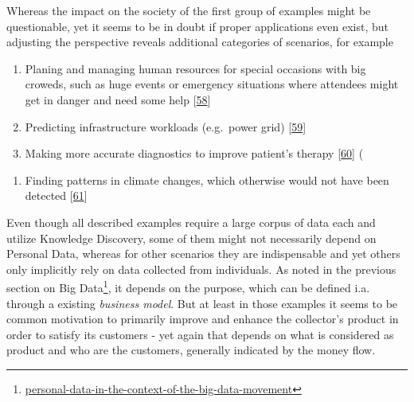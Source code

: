 \documentclass[12pt,english,a4paper,titlepage,cleardoublepage=empty,dottedtoc]{report}
\renewcommand{\href}[2]{#2\footnote{\url{#1}}}
\providecommand{\tightlist}{%
  \setlength{\itemsep}{0pt}\setlength{\parskip}{0pt}}
\begin{document}
Whereas the impact on the society of the first group of examples might
be questionable, yet it seems to be in doubt if proper applications even
exist, but adjusting the perspective reveals additional categories of
scenarios, for example

\begin{enumerate}
\def\labelenumi{(\Alph{enumi})}
\setcounter{enumi}{3}
\item
  Planing and managing human resources for special occasions with big
  croweds, such as huge events or emergency situations where attendees
  might get in danger and need some help
  {[}\protect\hyperlink{ref-estimating-the-locations-of-emergency-events-from-twitter-streams_2014}{58}{]}
\item
  Predicting infrastructure workloads (e.g.~power grid)
  {[}\protect\hyperlink{ref-paper_2015_improving-power-grid-monitoring-data-quality-an-efficient-machine-learning-framework-for-missing-data-prediction}{59}{]}
\item
  Making more accurate diagnostics to improve patient's therapy
  {[}\protect\hyperlink{ref-the-practice-of-predictive-analytics-in-healthcare_2013}{60}{]}
  (
\end{enumerate}

\begin{enumerate}
\def\labelenumi{\Alph{enumi})}
\setcounter{enumi}{6}
\tightlist
\item
  Finding patterns in climate changes, which otherwise would not have
  been detected
  {[}\protect\hyperlink{ref-data-collection-for-climate-changes_2014}{61}{]}
\end{enumerate}

Even though all described examples require a large corpus of data each
and utilize Knowledge Discovery, some of them might not necessarily
depend on Personal Data, whereas for other scenarios they are
indispensable and yet others only implicitly rely on data collected from
individuals. As noted in the
\href{personal-data-in-the-context-of-the-big-data-movement}{previous
section on Big Data}, it depends on the purpose, which can be defined
i.a. through a existing \emph{business model}. But at least in those
examples it seems to be common motivation to primarily improve and
enhance the collector's product in order to satisfy its customers - yet
again that depends on what is considered as product and who are the
customers, generally indicated by the money flow.
\end{document}
